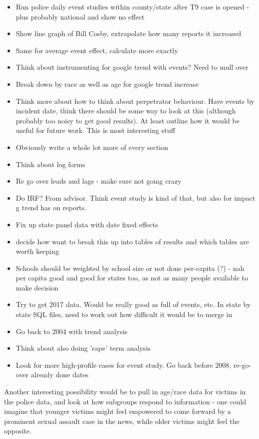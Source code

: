 \documentclass[AER,draftmode]{AEA}
\begin{document}
\begin{itemize}
    \item Run police daily event studies within county/state after T9 case is opened - plus probably national and show no effect
    \item Show line graph of Bill Cosby, extrapolate how many reports it increased
    \item Same for average event effect, calculate more exactly
    \item Think about instrumenting for google trend with events? Need to mull over
    \item Break down by race as well as age for google trend increase
    \item Think more about how to think about perpetrator behaviour. Have events by incident date, think there should be some way to look at this (although probably too noisy to get good results). At least outline how it would be useful for future work. This is most interesting stuff
    \item Obviously write a whole lot more of every section
    \item Think about log forms
    \item Re go over leads and lags - make sure not going crazy
    \item Do IRF? From advisor. Think event study is kind of that, but also for impact g trend has on reports.
    \item Fix up state panel data with date fixed effects
    \item decide how want to break this up into tables of results and which tables are worth keeping
    \item Schools should be weighted by school size or not done per-capita (?) - nah per capita good and good for states too, as not as many people available to make decision
    \item Try to get 2017 data. Would be really good as full of events, etc. In state by state SQL files, need to work out how difficult it would be to merge in
    \item Go back to 2004 with trend analysis
    \item Think about also doing 'rape' term analysis
    \item Look for more high-profile cases for event study. Go back before 2008, re-go-over already done dates
\end{itemize}

Another interesting possibility would be to pull in age/race data for victims in the police data, and look at how subgroups respond to information - one could imagine that younger victims might feel empowered to come forward by a prominent sexual assault case in the news, while older victims might feel the opposite.
\end{document}
